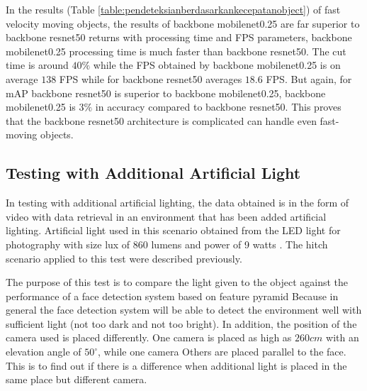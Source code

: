 In the results (Table \ref{table:pendeteksianberdasarkankecepatanobject}) of fast velocity moving objects, 
the results of backbone mobilenet0.25 are far superior to
backbone resnet50 returns with processing time and FPS parameters, 
backbone mobilenet0.25 processing time is much faster than 
backbone resnet50. The cut time is around $40\%$ while the FPS 
obtained by backbone mobilenet0.25 is on average $138$ FPS while for 
backbone resnet50 averages $18.6$ FPS. But again, for mAP backbone resnet50 is superior to backbone mobilenet0.25, 
backbone mobilenet0.25 is $3\%$ in accuracy compared to backbone resnet50. 
This proves that the backbone resnet50 architecture is complicated
can handle even fast-moving objects.

\subsection{Testing with Additional Artificial Light}

In testing with additional artificial lighting, the data obtained is in the form of video
with data retrieval in an environment that has been
added artificial lighting. Artificial light used
in this scenario obtained from the LED light for photography with size
lux of 860 lumens and power of 9 watts \citep{nugrohoevalution2016}. 
The hitch scenario applied to this test were described previously.

The purpose of this test is to compare the light given to the object 
against the performance of a face detection system based on feature pyramid
Because in general the face detection system will be able to detect the environment well with sufficient light (not too dark and not too bright).
In addition, the position of the camera used is placed differently. One camera is placed as high as $260cm$ with an elevation angle of $50^\circ$, while one camera
Others are placed parallel to the face. This is to find out if there is a difference when additional light is placed in the same place but
different camera.

